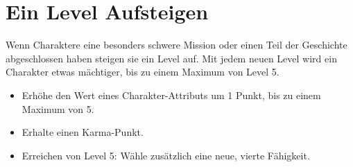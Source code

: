 \section{Ein Level Aufsteigen}
Wenn Charaktere eine besonders schwere Mission oder einen Teil der Geschichte abgeschlossen haben steigen sie ein Level auf. Mit jedem neuen Level wird ein Charakter etwas mächtiger, bis zu einem Maximum von Level 5.
\begin{itemize}
\item Erhöhe den Wert eines Charakter-Attributs um 1 Punkt, bis zu einem Maximum von 5.
\item Erhalte einen Karma-Punkt.
\item Erreichen von Level 5: Wähle zusätzlich eine neue, vierte Fähigkeit.
\end{itemize}